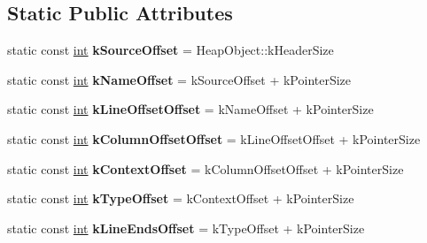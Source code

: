 \subsection*{Static Public Attributes}
\begin{DoxyCompactItemize}
\item 
\mbox{\label{classv8_1_1internal_1_1Script_a225adb25596f83c8821fe3eabd39c511}} 
static const \mbox{\hyperlink{classint}{int}} {\bfseries k\+Source\+Offset} = Heap\+Object\+::k\+Header\+Size
\item 
\mbox{\label{classv8_1_1internal_1_1Script_a40ff6e23759cd2b3a04ecf027325ce78}} 
static const \mbox{\hyperlink{classint}{int}} {\bfseries k\+Name\+Offset} = k\+Source\+Offset + k\+Pointer\+Size
\item 
\mbox{\label{classv8_1_1internal_1_1Script_a956dac18eae162c1b27233b8dde59f24}} 
static const \mbox{\hyperlink{classint}{int}} {\bfseries k\+Line\+Offset\+Offset} = k\+Name\+Offset + k\+Pointer\+Size
\item 
\mbox{\label{classv8_1_1internal_1_1Script_a07bdb4450a61351c14c57340cb433def}} 
static const \mbox{\hyperlink{classint}{int}} {\bfseries k\+Column\+Offset\+Offset} = k\+Line\+Offset\+Offset + k\+Pointer\+Size
\item 
\mbox{\label{classv8_1_1internal_1_1Script_aa5f92f3d5a8070ff039dd47e866d942e}} 
static const \mbox{\hyperlink{classint}{int}} {\bfseries k\+Context\+Offset} = k\+Column\+Offset\+Offset + k\+Pointer\+Size
\item 
\mbox{\label{classv8_1_1internal_1_1Script_a209c86d068d81195af0c6382f771f5ae}} 
static const \mbox{\hyperlink{classint}{int}} {\bfseries k\+Type\+Offset} = k\+Context\+Offset + k\+Pointer\+Size
\item 
\mbox{\label{classv8_1_1internal_1_1Script_a4ad5125df9cf76582ea2a70b11c70bba}} 
static const \mbox{\hyperlink{classint}{int}} {\bfseries k\+Line\+Ends\+Offset} = k\+Type\+Offset + k\+Pointer\+Size
\item 
\mbox{\label{classv8_1_1internal_1_1Script_aee4b2225f5e2ec14f122c6d06d0f1c51}} 

\end{DoxyCompactItemize}
